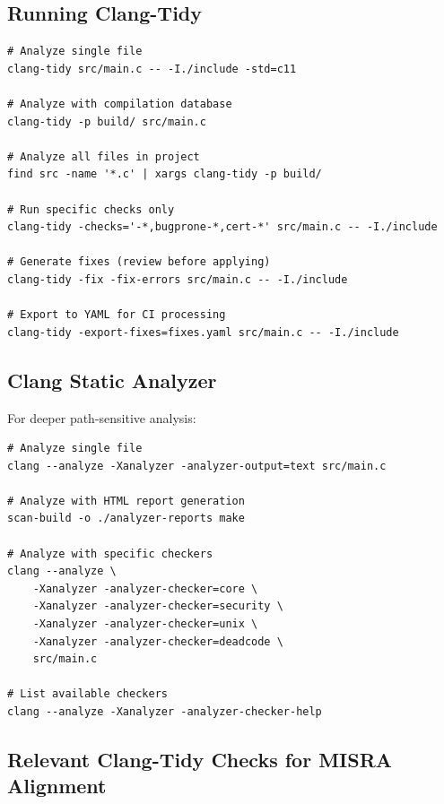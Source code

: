 \documentclass[11pt,letterpaper]{report}
\begin{document}
\subsection{Running Clang-Tidy}

\begin{lstlisting}[style=bashstyle]
# Analyze single file
clang-tidy src/main.c -- -I./include -std=c11

# Analyze with compilation database
clang-tidy -p build/ src/main.c

# Analyze all files in project
find src -name '*.c' | xargs clang-tidy -p build/

# Run specific checks only
clang-tidy -checks='-*,bugprone-*,cert-*' src/main.c -- -I./include

# Generate fixes (review before applying)
clang-tidy -fix -fix-errors src/main.c -- -I./include

# Export to YAML for CI processing
clang-tidy -export-fixes=fixes.yaml src/main.c -- -I./include
\end{lstlisting}

\subsection{Clang Static Analyzer}

For deeper path-sensitive analysis:

\begin{lstlisting}[style=bashstyle]
# Analyze single file
clang --analyze -Xanalyzer -analyzer-output=text src/main.c

# Analyze with HTML report generation
scan-build -o ./analyzer-reports make

# Analyze with specific checkers
clang --analyze \
    -Xanalyzer -analyzer-checker=core \
    -Xanalyzer -analyzer-checker=security \
    -Xanalyzer -analyzer-checker=unix \
    -Xanalyzer -analyzer-checker=deadcode \
    src/main.c

# List available checkers
clang --analyze -Xanalyzer -analyzer-checker-help
\end{lstlisting}

\subsection{Relevant Clang-Tidy Checks for MISRA Alignment}
\end{document}
